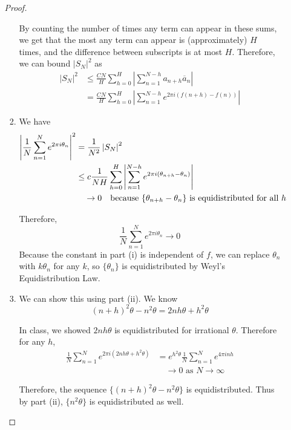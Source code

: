 \documentclass[a4paper]{article}
\begin{document}
\begin{enumerate}
\begin{enumerate}
\begin{proof}
\begin{enumerate}
        By counting the number of times any term can appear in these sums, we get that the most any term can appear is (approximately) $H$ times, and
        the difference between subscripts is at most $H$. Therefore, we can bound $|S_N|^2$ as
        \begin{align*}
          |S_N|^2 &\leq \frac{C N}{H} \sum_{h=0}^H \left| \sum_{n=1}^{N-h} a_{n+h} \overline{a}_n \right| \\
          &= \frac{C N}{H} \sum_{h=0}^H \left| \sum_{n=1}^{N-h} e^{2 \pi i \left( f(n+h) - f(n) \right)} \right|
        \end{align*}

      \item
        We have
        \begin{align*}
          \left| \frac{1}{N} \sum_{n=1}^N e^{2\pi i \theta_n} \right|^2 &= \frac{1}{N^2} \left| S_N \right|^2 \\
          &\leq c \frac{1}{NH} \sum_{h=0}^H \left| \sum_{n=1}^{N-h} e^{2 \pi i \left( \theta_{n+h} - \theta_n \right)} \right| \\
          &\quad \to 0 \quad \parbox{8cm}{because $\{ \theta_{n+h} - \theta_n \}$ is equidistributed for all $h$}
        \end{align*}

        Therefore,
        \[ \frac{1}{N} \sum_{n=1}^N e^{2 \pi i \theta_n} \to 0 \]
        Because the constant in part (i) is independent of $f$, we can replace $\theta_n$ with $k \theta_n$ for any $k$, so
        $\{\theta_n\}$ is equidistributed by Weyl's Equidistribution Law.

      \item
        We can show this using part (ii). We know
        \[ (n+h)^2 \theta - n^2 \theta = 2nh \theta + h^2 \theta \]

        In class, we showed $2nh \theta$ is equidistributed for irrational $\theta$. Therefore for any $h$,
        \begin{align*}
          \frac{1}{N} \sum_{n=1}^N e^{2\pi i (2nh \theta + h^2 \theta)} &= e^{h^2 \theta} \frac{1}{N} \sum_{n=1}^N e^{4 \pi i n h} \\
          &\quad \to 0 \text{ as $N \to \infty$ }
        \end{align*}

        Therefore, the sequence $\{ (n+h)^2 \theta - n^2 \theta \}$ is equidistributed. Thus by part (ii), $\{ n^2 \theta \}$ is equidistributed as
        well.
    \end{enumerate}

  \end{proof}

\end{enumerate}

\end{enumerate}
\end{document}
